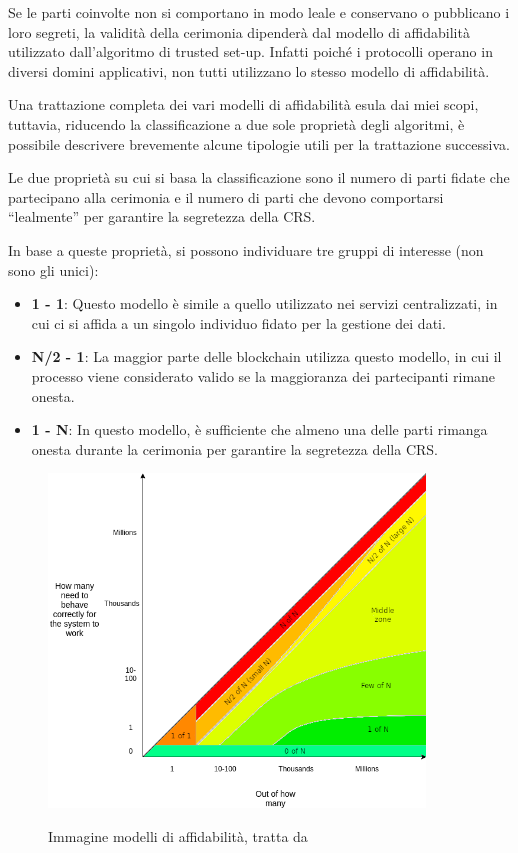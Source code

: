 Se le parti coinvolte non si comportano in modo leale e conservano o pubblicano i loro segreti, la validità della
cerimonia dipenderà dal modello di affidabilità utilizzato dall'algoritmo di trusted set-up. Infatti poiché i protocolli
operano in diversi domini applicativi, non tutti utilizzano lo stesso modello di affidabilità. 

Una trattazione completa dei vari modelli di affidabilità esula dai miei scopi, tuttavia, riducendo la classificazione a due sole proprietà
degli algoritmi, è possibile descrivere brevemente alcune tipologie utili per la trattazione successiva. 

Le due proprietà su cui si basa la classificazione sono il numero di parti fidate che partecipano alla cerimonia e il numero di
parti che devono comportarsi “lealmente” per garantire la segretezza della CRS.

In base a queste proprietà, si possono individuare tre gruppi di interesse (non sono gli unici):
\begin{itemize}
    \item \textbf{1 - 1}: Questo modello è simile a quello utilizzato nei servizi centralizzati, in cui ci si affida a un singolo
    individuo fidato per la gestione dei dati. 
    \item \textbf{N/2 - 1}: La maggior parte delle blockchain utilizza questo modello, in
    cui il processo viene considerato valido se la maggioranza dei partecipanti rimane onesta.
    \item \textbf{1 - N}: In questo modello, è sufficiente che almeno una delle parti rimanga onesta durante la
    cerimonia per garantire la segretezza della CRS.
\end{itemize}

\begin{figure}[H]
    \centering
    \includegraphics[width=10cm]{./chapters/1.state-of-art/images/12.trusted_models.png}
    \label{fig:trusted_models}
    \captionsetup{justification=centering}
    \caption{Immagine modelli di affidabilità, tratta da \cite{trusted-models}}
\end{figure}

